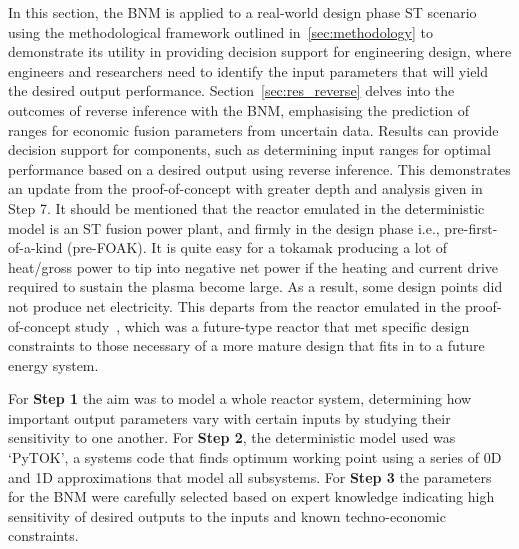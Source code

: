 \documentclass[journal]{IEEEtran}
\begin{document}
In this section, the BNM is applied to a real-world design phase ST scenario using the methodological framework outlined in~\ref{sec:methodology} to demonstrate its utility in providing decision support for engineering design, where engineers and researchers need to identify the input parameters that will yield the desired output performance. Section~\ref{sec:res_reverse} delves into the outcomes of reverse inference with the BNM, emphasising the prediction of ranges for economic fusion parameters from uncertain data. Results can provide decision support for components, such as determining input ranges for optimal performance based on a desired output using reverse inference. This demonstrates an update from the proof-of-concept with greater depth and analysis given in Step 7. It should be mentioned that the reactor emulated in the deterministic model is an ST fusion power plant, and firmly in the design phase i.e., pre-first-of-a-kind (pre-FOAK). It is quite easy for a tokamak producing a lot of heat/gross power to tip into negative net power if the heating and current drive required to sustain the plasma become large. As a result, some design points did not produce net electricity. This departs from the reactor emulated in the proof-of-concept study~\cite{Griffiths2024}, which was a future-type reactor that met specific design constraints to those necessary of a more mature design that fits in to a future energy system.

For \textbf{Step 1} the aim was to model a whole reactor system, determining how important output parameters vary with certain inputs by studying their sensitivity to one another. For \textbf{Step 2}, the deterministic model used was `PyTOK', a systems code that finds optimum working point using a series of 0D and 1D approximations that model all subsystems. For \textbf{Step 3} the parameters for the BNM were carefully selected based on expert knowledge indicating high sensitivity of desired outputs to the inputs and known techno-economic constraints. 
\end{document}
